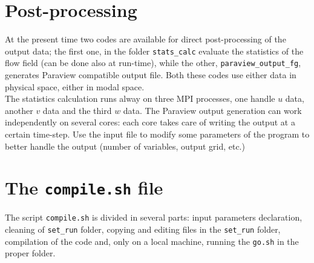 \section{Post-processing}
At the present time two codes are available for direct post-processing of the output data; the first one, in the folder \texttt{stats\_calc} evaluate the statistics of the flow field (can be done also at run-time), while the other, \texttt{paraview\_output\_fg}, generates Paraview compatible output file. 
Both these codes use either data in physical space, either in modal space.\\
The statistics calculation runs alway on three MPI processes, one handle $u$ data, another $v$ data and the third $w$ data. 
The Paraview output generation can work independently on several cores: each core takes care of writing the output at a certain time-step. 
Use the input file to modify some parameters of the program to better handle the output (number of variables, output grid, etc.)

\section{The \texttt{compile.sh} file}
\label{sec: compile}
The script \texttt{compile.sh} is divided in several parts: input parameters declaration, cleaning of \texttt{set\_run} folder, copying and editing files in the \texttt{set\_run} folder, compilation of the code and, only on a local machine, running the \texttt{go.sh} in the proper folder.

